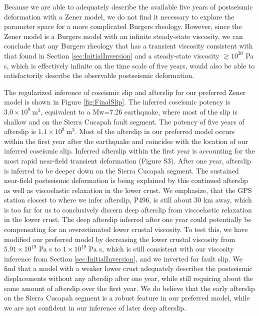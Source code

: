 \documentclass[draft,linenumbers]{AGUJournal}
\begin{document}
Because we are able to adequately describe the available five years of postseismic deformation with a Zener model, we do not find it necessary to explore the parameter space for a more complicated Burgers rheology.  However, since the Zener model is a Burgers model with an infinite steady-state viscosity, we can conclude that any Burgers rheology that has a transient viscosity consistent with that found in Section \ref{sec:InitialInversion} and a steady-state viscosity $\gtrsim10^{20}$ Pa s, which is effectively infinite on the time scale of five years, would also be able to satisfactorily describe the observable postseismic deformation.        
  
The regularized inference of coseismic slip and afterslip for our preferred Zener model is shown in Figure \ref{fig:FinalSlip}.  The inferred coseismic potency is $3.0\times10^{9}\ \mathrm{m}^3$, equivalent to a Mw=7.26 earthquake, where most of the slip is shallow and on the Sierra Cucapah fault segment.  The potency of five years of afterslip is $1.1\times10^{9}\ \mathrm{m}^3$. Most of the afterslip in our preferred model occurs within the first year after the earthquake and coincides with the location of our inferred coseismic slip. Inferred afterslip within the first year is accounting for the most rapid near-field transient deformation (Figure S3).  After one year, afterslip is inferred to be deeper down on the Sierra Cucapah segment.  The sustained near-field postseismic deformation is being explained by this continued afterslip as well as viscoelastic relaxation in the lower crust. We emphasize, that the GPS station closest to where we infer afterslip, P496, is still about 30 km away, which is too far for us to conclusively discern deep afterslip from viscoelastic relaxation in the lower crust.  The deep afterslip inferred after one year could potentially be compensating for an overestimated lower crustal viscosity.  To test this, we have modified our preferred model by decreasing the lower crustal viscosity from $5.91\times10^{19}$ Pa s to $1\times10^{19}$ Pa s, which is still consistent with our viscosity inference from Section \ref{sec:InitialInversion}, and we inverted for fault slip.  We find that a model with a weaker lower crust adequately describes the postseismic displacements without any afterslip after one year, while still requiring about the same amount of afterslip over the first year. We do believe that the early afterslip on the Sierra Cucapah segment is a robust feature in our preferred model, while we are not confident in our inference of later deep afterslip.                   
\end{document}
